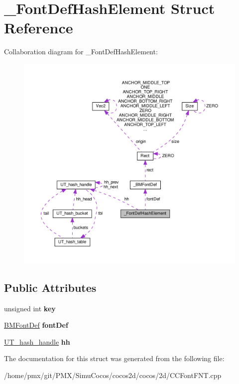 \hypertarget{struct__FontDefHashElement}{}\section{\+\_\+\+Font\+Def\+Hash\+Element Struct Reference}
\label{struct__FontDefHashElement}


Collaboration diagram for \+\_\+\+Font\+Def\+Hash\+Element\+:
\nopagebreak
\begin{figure}[H]
\begin{center}
\leavevmode
\includegraphics[width=350pt]{struct__FontDefHashElement__coll__graph}
\end{center}
\end{figure}
\subsection*{Public Attributes}
\begin{DoxyCompactItemize}
\item 
unsigned int {\bfseries key}
\item 
\hyperlink{structBMFontDef}{B\+M\+Font\+Def} {\bfseries font\+Def}
\item 
\hyperlink{structUT__hash__handle}{U\+T\+\_\+hash\+\_\+handle} {\bfseries hh}
\end{DoxyCompactItemize}


The documentation for this struct was generated from the following file\+:\begin{DoxyCompactItemize}
\item 
/home/pmx/git/\+P\+M\+X/\+Simu\+Cocos/cocos2d/cocos/2d/C\+C\+Font\+F\+N\+T.\+cpp\end{DoxyCompactItemize}
